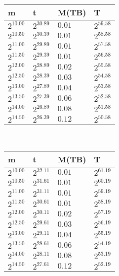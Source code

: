 \begin{tabular}{llll}
m & t & M(TB) & T \\ \hline
$2^{10.00}$ & $2^{30.89}$ & $0.01$ & $2^{59.58}$ \\
$2^{10.50}$ & $2^{30.39}$ & $0.01$ & $2^{58.58}$ \\
$2^{11.00}$ & $2^{29.89}$ & $0.01$ & $2^{57.58}$ \\
$2^{11.50}$ & $2^{29.39}$ & $0.01$ & $2^{56.58}$ \\
$2^{12.00}$ & $2^{28.89}$ & $0.02$ & $2^{55.58}$ \\
$2^{12.50}$ & $2^{28.39}$ & $0.03$ & $2^{54.58}$ \\
$2^{13.00}$ & $2^{27.89}$ & $0.04$ & $2^{53.58}$ \\
$2^{13.50}$ & $2^{27.39}$ & $0.06$ & $2^{52.58}$ \\
$2^{14.00}$ & $2^{26.89}$ & $0.08$ & $2^{51.58}$ \\
$2^{14.50}$ & $2^{26.39}$ & $0.12$ & $2^{50.58}$ \\
\end{tabular}
 \ 
\begin{tabular}{llll}
m & t & M(TB) & T \\ \hline
$2^{10.00}$ & $2^{32.11}$ & $0.01$ & $2^{61.19}$ \\
$2^{10.50}$ & $2^{31.61}$ & $0.01$ & $2^{60.19}$ \\
$2^{11.00}$ & $2^{31.11}$ & $0.01$ & $2^{59.19}$ \\
$2^{11.50}$ & $2^{30.61}$ & $0.01$ & $2^{58.19}$ \\
$2^{12.00}$ & $2^{30.11}$ & $0.02$ & $2^{57.19}$ \\
$2^{12.50}$ & $2^{29.61}$ & $0.03$ & $2^{56.19}$ \\
$2^{13.00}$ & $2^{29.11}$ & $0.04$ & $2^{55.19}$ \\
$2^{13.50}$ & $2^{28.61}$ & $0.06$ & $2^{54.19}$ \\
$2^{14.00}$ & $2^{28.11}$ & $0.08$ & $2^{53.19}$ \\
$2^{14.50}$ & $2^{27.61}$ & $0.12$ & $2^{52.19}$ \\
\end{tabular}
 \ 
